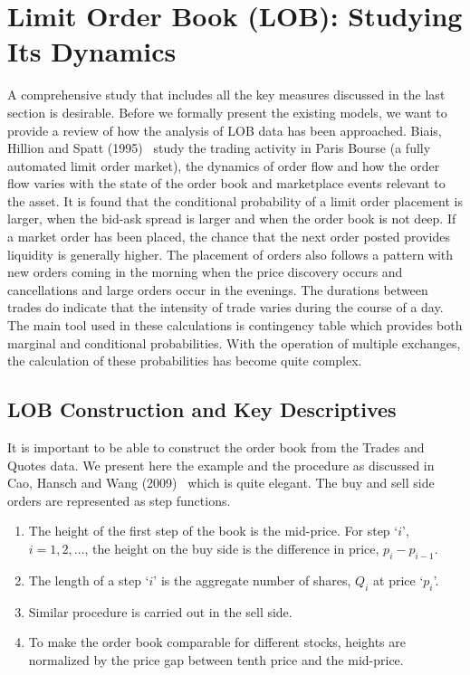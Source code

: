 \section{Limit Order Book (LOB): Studying Its Dynamics\label{sec:lob_study_dynamics}}\label{in:labmod1}

A comprehensive study that includes all the key measures discussed in the last section is desirable. Before we formally present the existing models, we want to provide a review of how the analysis of LOB data has been approached. Biais, Hillion and Spatt (1995)~\cite{spalt} study the trading activity in Paris Bourse (a fully automated limit order market), the dynamics of order flow and how the order flow varies with the state of the order book and marketplace events relevant to the asset. It is found that the conditional probability of a limit order placement is larger, when the bid-ask spread is larger and when the order book is not deep. If a market order has been placed, the chance that the next order posted provides liquidity is generally higher. The placement of orders also follows a pattern with new orders coming in the morning when the price discovery occurs and cancellations and large orders occur in the evenings. The durations between trades do indicate that the intensity of trade varies during the course of a day. The main tool used in these calculations is contingency table which provides both marginal and conditional probabilities. With the operation of multiple exchanges, the calculation of these probabilities has become quite complex. 


\subsection{LOB Construction and Key Descriptives\label{sec:lob_construct_key}}

It is important to be able to construct the order book from the Trades and Quotes data. We present here the example and the procedure as discussed in Cao, Hansch and Wang (2009)~\cite{caohanschwang} which is quite elegant. The buy and sell side orders are represented as step functions. 
        \begin{enumerate}[--]
        \item The height of the first step of the book is the mid-price. For step `$i$', $i=1,2,\ldots$, the height on the buy side is the difference in price, $p_i - p_{i-1}$. 
        \item The length of a step `$i$' is the aggregate number of shares, $Q_i$ at price `$p_i$'.
        \item Similar procedure is carried out in the sell side.
        \item To make the order book comparable for different stocks, heights are normalized by the price gap between tenth price and the mid-price. 
        \end{enumerate}


